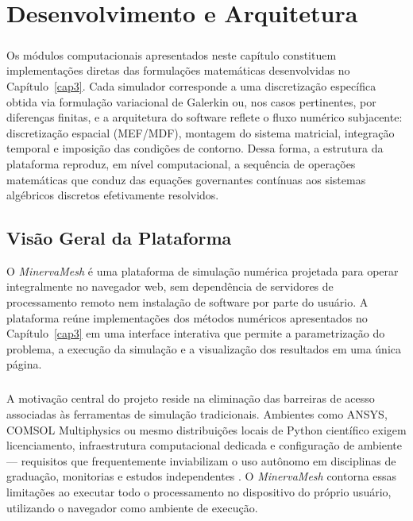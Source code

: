 \chapter{Desenvolvimento e Arquitetura}
\label{cap4}

\paragraph{}Os módulos computacionais apresentados neste capítulo constituem implementações diretas das formulações matemáticas desenvolvidas no Capítulo~\ref{cap3}. Cada simulador corresponde a uma discretização específica obtida via formulação variacional de Galerkin ou, nos casos pertinentes, por diferenças finitas, e a arquitetura do software reflete o fluxo numérico subjacente: discretização espacial (MEF/MDF), montagem do sistema matricial, integração temporal e imposição das condições de contorno. Dessa forma, a estrutura da plataforma reproduz, em nível computacional, a sequência de operações matemáticas que conduz das equações governantes contínuas aos sistemas algébricos discretos efetivamente resolvidos.

\section{Visão Geral da Plataforma}
\label{sec:visao_geral}

O \textit{MinervaMesh} é uma plataforma de simulação numérica projetada para operar integralmente no navegador web, sem dependência de servidores de processamento remoto nem instalação de software por parte do usuário. A plataforma reúne implementações dos métodos numéricos apresentados no Capítulo~\ref{cap3} em uma interface interativa que permite a parametrização do problema, a execução da simulação e a visualização dos resultados em uma única página.

\paragraph{}A motivação central do projeto reside na eliminação das barreiras de acesso associadas às ferramentas de simulação tradicionais. Ambientes como ANSYS, COMSOL Multiphysics ou mesmo distribuições locais de Python científico exigem licenciamento, infraestrutura computacional dedicada e configuração de ambiente --- requisitos que frequentemente inviabilizam o uso autônomo em disciplinas de graduação, monitorias e estudos independentes \cite{Anjos2024}. O \textit{MinervaMesh} contorna essas limitações ao executar todo o processamento no dispositivo do próprio usuário, utilizando o navegador como ambiente de execução.

